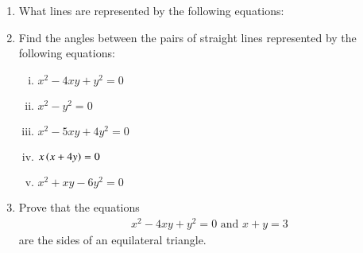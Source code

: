 \begin{enumerate}[1.]
\item What lines are represented by the following equations:
\begin{multicols}{2}
\end{multicols}
\item Find the angles between the pairs of straight lines represented by the following equations:
\begin{multicols}{2}
\begin{enumerate}[(i)]
\item
$
x^2-4xy+y^2 = 0
$
\item
$
x^2-y^2 = 0
$
\item
$
x^2-5xy+4y^2 = 0
$
\item
$
x\left(x+4y\right) = 0
$
\item
$
x^2+xy-6y^2 = 0
$
\end{enumerate}
\end{multicols}
\item Prove that the equations
\begin{align*}
x^2-4xy+y^2 = 0 \text{ and } x+y = 3
\end{align*}
are the sides of an equilateral triangle.
\end{enumerate}
